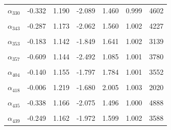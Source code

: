 \begin{longtable}{lrrrrrr}
$\alpha_{330}$ & -0.332 & 1.190 & -2.089 & 1.460 & 0.999 & 4602\\
\cellcolor{gray!10}{$\alpha_{334}$} & \cellcolor{gray!10}{-0.511} & \cellcolor{gray!10}{1.159} & \cellcolor{gray!10}{-2.322} & \cellcolor{gray!10}{1.232} & \cellcolor{gray!10}{1.003} & \cellcolor{gray!10}{4278}\\
$\alpha_{343}$ & -0.287 & 1.173 & -2.062 & 1.560 & 1.002 & 4227\\
\cellcolor{gray!10}{$\alpha_{349}$} & \cellcolor{gray!10}{-0.285} & \cellcolor{gray!10}{1.125} & \cellcolor{gray!10}{-1.957} & \cellcolor{gray!10}{1.523} & \cellcolor{gray!10}{1.001} & \cellcolor{gray!10}{3956}\\
$\alpha_{353}$ & -0.183 & 1.142 & -1.849 & 1.641 & 1.002 & 3139\\
\cellcolor{gray!10}{$\alpha_{355}$} & \cellcolor{gray!10}{-0.385} & \cellcolor{gray!10}{1.195} & \cellcolor{gray!10}{-2.113} & \cellcolor{gray!10}{1.415} & \cellcolor{gray!10}{1.001} & \cellcolor{gray!10}{4722}\\
$\alpha_{357}$ & -0.609 & 1.144 & -2.492 & 1.085 & 1.001 & 3780\\
\cellcolor{gray!10}{$\alpha_{362}$} & \cellcolor{gray!10}{-0.391} & \cellcolor{gray!10}{1.198} & \cellcolor{gray!10}{-2.181} & \cellcolor{gray!10}{1.383} & \cellcolor{gray!10}{1.003} & \cellcolor{gray!10}{4907}\\
$\alpha_{404}$ & -0.140 & 1.155 & -1.797 & 1.784 & 1.001 & 3552\\
\cellcolor{gray!10}{$\alpha_{411}$} & \cellcolor{gray!10}{-0.436} & \cellcolor{gray!10}{1.168} & \cellcolor{gray!10}{-2.250} & \cellcolor{gray!10}{1.349} & \cellcolor{gray!10}{1.002} & \cellcolor{gray!10}{4551}\\
$\alpha_{418}$ & -0.006 & 1.219 & -1.680 & 2.005 & 1.003 & 2020\\
\cellcolor{gray!10}{$\alpha_{427}$} & \cellcolor{gray!10}{-0.309} & \cellcolor{gray!10}{1.140} & \cellcolor{gray!10}{-2.041} & \cellcolor{gray!10}{1.486} & \cellcolor{gray!10}{1.000} & \cellcolor{gray!10}{4094}\\
$\alpha_{435}$ & -0.338 & 1.166 & -2.075 & 1.496 & 1.000 & 4888\\
\cellcolor{gray!10}{$\alpha_{436}$} & \cellcolor{gray!10}{-0.336} & \cellcolor{gray!10}{1.141} & \cellcolor{gray!10}{-2.070} & \cellcolor{gray!10}{1.488} & \cellcolor{gray!10}{1.003} & \cellcolor{gray!10}{4119}\\
$\alpha_{439}$ & -0.249 & 1.162 & -1.972 & 1.599 & 1.002 & 3588\\

\end{longtable}
